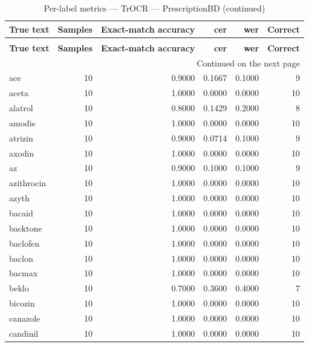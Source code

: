 \begingroup
\setlength{\tabcolsep}{2.5pt}
\renewcommand{\arraystretch}{1.05}
\sloppy
\scriptsize
\begin{longtable}{p{3.0cm}rrrrr}
\caption{Per-label metrics — TrOCR — PrescriptionBD}\label{tab:e3-01_trocr_evaluation-per-label}\\
\toprule
\textbf{True text} & \textbf{Samples} & \textbf{Exact-match accuracy} & \textbf{cer} & \textbf{wer} & \textbf{Correct} \\
\midrule
\endfirsthead
\caption*{Per-label metrics — TrOCR — PrescriptionBD (continued)}\\
\toprule
\textbf{True text} & \textbf{Samples} & \textbf{Exact-match accuracy} & \textbf{cer} & \textbf{wer} & \textbf{Correct} \\
\midrule
\endhead
\midrule
\multicolumn{6}{r}{Continued on the next page}\\
\endfoot
\bottomrule
\endlastfoot
ace & 10 & 0.9000 & 0.1667 & 0.1000 & 9 \\
aceta & 10 & 1.0000 & 0.0000 & 0.0000 & 10 \\
alatrol & 10 & 0.8000 & 0.1429 & 0.2000 & 8 \\
amodis & 10 & 1.0000 & 0.0000 & 0.0000 & 10 \\
atrizin & 10 & 0.9000 & 0.0714 & 0.1000 & 9 \\
axodin & 10 & 1.0000 & 0.0000 & 0.0000 & 10 \\
az & 10 & 0.9000 & 0.1000 & 0.1000 & 9 \\
azithrocin & 10 & 1.0000 & 0.0000 & 0.0000 & 10 \\
azyth & 10 & 1.0000 & 0.0000 & 0.0000 & 10 \\
bacaid & 10 & 1.0000 & 0.0000 & 0.0000 & 10 \\
backtone & 10 & 1.0000 & 0.0000 & 0.0000 & 10 \\
baclofen & 10 & 1.0000 & 0.0000 & 0.0000 & 10 \\
baclon & 10 & 1.0000 & 0.0000 & 0.0000 & 10 \\
bacmax & 10 & 1.0000 & 0.0000 & 0.0000 & 10 \\
beklo & 10 & 0.7000 & 0.3600 & 0.4000 & 7 \\
bicozin & 10 & 1.0000 & 0.0000 & 0.0000 & 10 \\
canazole & 10 & 1.0000 & 0.0000 & 0.0000 & 10 \\
candinil & 10 & 1.0000 & 0.0000 & 0.0000 & 10 \\

\end{longtable}
